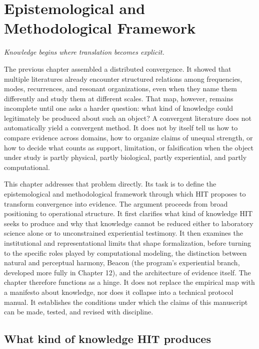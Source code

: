 \chapter{Epistemological and Methodological Framework}

\epigraph{\emph{Knowledge begins where translation becomes explicit.}}{}

The previous chapter assembled a distributed convergence. It showed that multiple literatures already encounter structured relations among frequencies, modes, recurrences, and resonant organizations, even when they name them differently and study them at different scales. That map, however, remains incomplete until one asks a harder question: what kind of knowledge could legitimately be produced about such an object? A convergent literature does not automatically yield a convergent method. It does not by itself tell us how to compare evidence across domains, how to organize claims of unequal strength, or how to decide what counts as support, limitation, or falsification when the object under study is partly physical, partly biological, partly experiential, and partly computational.

This chapter addresses that problem directly. Its task is to define the epistemological and methodological framework through which HIT proposes to transform convergence into evidence. The argument proceeds from broad positioning to operational structure. It first clarifies what kind of knowledge HIT seeks to produce and why that knowledge cannot be reduced either to laboratory science alone or to unconstrained experiential testimony. It then examines the institutional and representational limits that shape formalization, before turning to the specific roles played by computational modeling, the distinction between natural and perceptual harmony, Beacon (the program's experiential branch, developed more fully in Chapter 12), and the architecture of evidence itself. The chapter therefore functions as a hinge. It does not replace the empirical map with a manifesto about knowledge, nor does it collapse into a technical protocol manual. It establishes the conditions under which the claims of this manuscript can be made, tested, and revised with discipline.

\section{What kind of knowledge HIT produces}

